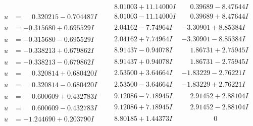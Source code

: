 \documentclass[1p]{elsarticle_modified}
\theoremstyle{definition}
\begin{document}
$$\begin{array}{c|c|c}
 & \phantom{-}8.01003 + 11.14000 I & \phantom{-}0.39689 - 8.47644 I \\ \hline\begin{aligned}
u &= \phantom{-}0.320215 - 0.704487 I\end{aligned}
 & \phantom{-}8.01003 - 11.14000 I & \phantom{-}0.39689 + 8.47644 I \\ \hline\begin{aligned}
u &= -0.315680 + 0.695529 I\end{aligned}
 & \phantom{-}2.04162 - 7.74964 I & -3.30901 + 8.85384 I \\ \hline\begin{aligned}
u &= -0.315680 - 0.695529 I\end{aligned}
 & \phantom{-}2.04162 + 7.74964 I & -3.30901 - 8.85384 I \\ \hline\begin{aligned}
u &= -0.338213 + 0.679862 I\end{aligned}
 & \phantom{-}8.91437 - 0.94078 I & \phantom{-}1.86731 + 2.75945 I \\ \hline\begin{aligned}
u &= -0.338213 - 0.679862 I\end{aligned}
 & \phantom{-}8.91437 + 0.94078 I & \phantom{-}1.86731 - 2.75945 I \\ \hline\begin{aligned}
u &= \phantom{-}0.320814 + 0.680420 I\end{aligned}
 & \phantom{-}2.53500 + 3.64664 I & -1.83229 - 2.76221 I \\ \hline\begin{aligned}
u &= \phantom{-}0.320814 - 0.680420 I\end{aligned}
 & \phantom{-}2.53500 - 3.64664 I & -1.83229 + 2.76221 I \\ \hline\begin{aligned}
u &= \phantom{-}0.600609 + 0.432783 I\end{aligned}
 & \phantom{-}9.12086 - 7.18945 I & \phantom{-}2.91452 + 2.88104 I \\ \hline\begin{aligned}
u &= \phantom{-}0.600609 - 0.432783 I\end{aligned}
 & \phantom{-}9.12086 + 7.18945 I & \phantom{-}2.91452 - 2.88104 I \\ \hline\begin{aligned}
u &= -1.244690 + 0.203790 I\end{aligned}
 & \phantom{-}8.80185 + 1.44373 I & \phantom{-0.000000 } 0 \\ \hline\begin{aligned}

\end{aligned}
\end{array}$$
\end{document}
